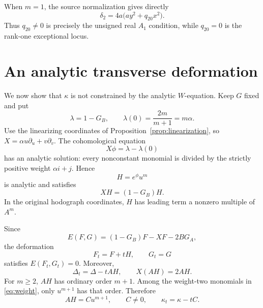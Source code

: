 \documentclass[11pt]{article}
\theoremstyle{remark}
\begin{document}
When $m=1$, the source normalization gives directly
\begin{equation}\label{eq:m1}
 \delta_2=4a\bigl(ay^2+q_{20}x^2\bigr).
\end{equation}
Thus $q_{20}\ne0$ is precisely the unsigned real $A_1$ condition, while
$q_{20}=0$ is the rank-one exceptional locus.

\section{An analytic transverse deformation}

We now show that $\kappa$ is not constrained by the analytic $W$-equation.
Keep $G$ fixed and put
\begin{equation}\label{eq:lambda}
 \lambda=1-G_B,
 \qquad
 \lambda(0)=\frac{2m}{m+1}=m\alpha.
\end{equation}
Use the linearizing coordinates of Proposition~\ref{prop:linearization},
so $X=\alpha u\partial_u+v\partial_v$.  The cohomological equation
\begin{equation}\label{eq:cohomology}
 X\phi=\lambda-\lambda(0)
\end{equation}
has an analytic solution: every nonconstant monomial is divided by the
strictly positive weight $\alpha i+j$.  Hence
\begin{equation}\label{eq:H}
 H=e^\phi u^m
\end{equation}
is analytic and satisfies
\begin{equation}\label{eq:Hhomogeneous}
 XH=(1-G_B)H.
\end{equation}
In the original hodograph coordinates, $H$ has leading term a nonzero
multiple of $A^m$.

Since
\[
 E(F,G)=(1-G_B)F-XF-2BG_A,
\]
the deformation
\begin{equation}\label{eq:deform}
 F_t=F+tH,
 \qquad
 G_t=G
\end{equation}
satisfies $E(F_t,G_t)=0$.  Moreover,
\[
 \Delta_t=\Delta-tAH,
 \qquad
 X(AH)=2AH.
\]
For $m\ge2$, $AH$ has ordinary order $m+1$.  Among the weight-two
monomials in \eqref{eq:weight}, only $u^{m+1}$ has that order.  Therefore
\begin{equation}\label{eq:kappat}
 AH=Cu^{m+1},
 \qquad C\ne0,
 \qquad
 \kappa_t=\kappa-tC.
\end{equation}
\end{document}
